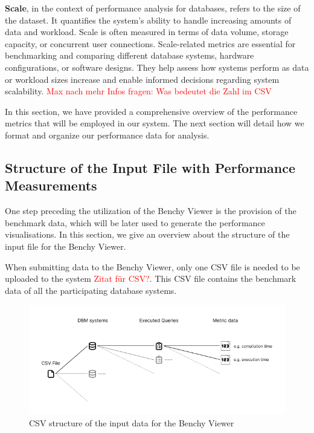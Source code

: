 \textbf{Scale}, in the context of performance analysis for databases, refers to the size of the dataset. It quantifies the system's ability to handle increasing amounts of data and workload. Scale is often measured in terms of data volume, storage capacity, or concurrent user connections. Scale-related metrics are essential for benchmarking and comparing different database systems, hardware configurations, or software designs. They help assess how systems perform as data or workload sizes increase and enable informed decisions regarding system scalability.
\textcolor{red}{Max nach mehr Infos fragen: Was bedeutet die Zahl im CSV}

In this section, we have provided a comprehensive overview of the performance metrics that will be employed in our system. The next section will detail how we format and organize our performance data for analysis.



\subsection{Structure of the Input File with Performance Measurements}
One step preceding the utilization of the Benchy Viewer is the provision of the benchmark data, which will be later used to generate the performance visualisations. In this section, we give an overview about the structure of the input file for the Benchy Viewer.

When submitting data to the Benchy Viewer, only one CSV file is needed to be uploaded to the system \textcolor{red}{Zitat für CSV?}. This CSV file contains the benchmark data of all the participating database systems.

\begin{figure}[h]
  \centering
  \includegraphics[width=1\linewidth]{figures/csv-structure.png}
  \caption{CSV structure of the input data for the Benchy Viewer}
  \label{fig:csv-structure}
\end{figure}


